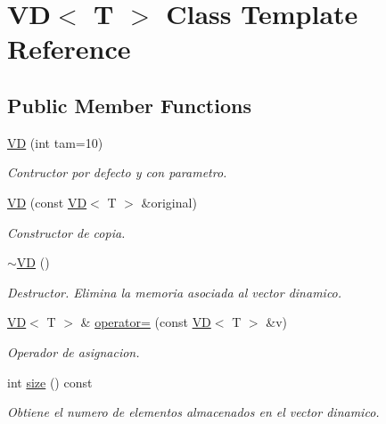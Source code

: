\hypertarget{class_v_d}{}\section{VD$<$ T $>$ Class Template Reference}
\label{class_v_d}
\subsection*{Public Member Functions}
\begin{DoxyCompactItemize}
\item 
\hyperlink{class_v_d_a1ce73549d14f68caecaa593de3255c30}{VD} (int tam=10)
\begin{DoxyCompactList}\small\item\em Contructor por defecto y con parametro. \end{DoxyCompactList}\item 
\hyperlink{class_v_d_a4f22b92dd8ace25d50311ccd61508dfc}{VD} (const \hyperlink{class_v_d}{VD}$<$ T $>$ \&original)
\begin{DoxyCompactList}\small\item\em Constructor de copia. \end{DoxyCompactList}\item 
\mbox{\label{class_v_d_a0533f99aa2fee31fde63edd6c4b8bb2d}} 
\hyperlink{class_v_d_a0533f99aa2fee31fde63edd6c4b8bb2d}{$\sim$\+VD} ()
\begin{DoxyCompactList}\small\item\em Destructor. Elimina la memoria asociada al vector dinamico. \end{DoxyCompactList}\item 
\hyperlink{class_v_d}{VD}$<$ T $>$ \& \hyperlink{class_v_d_a645b65a6343059cd921f6a2856c97249}{operator=} (const \hyperlink{class_v_d}{VD}$<$ T $>$ \&v)
\begin{DoxyCompactList}\small\item\em Operador de asignacion. \end{DoxyCompactList}\item 
\mbox{\label{class_v_d_a411ad026db1c8e0617d9031f1f1017a5}} 
int \hyperlink{class_v_d_a411ad026db1c8e0617d9031f1f1017a5}{size} () const
\begin{DoxyCompactList}\small\item\em Obtiene el numero de elementos almacenados en el vector dinamico. \end{DoxyCompactList}\item 

\end{DoxyCompactItemize}
